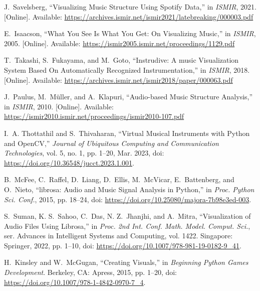 \documentclass{article}
\begin{document}
\newpage
\begin{thebibliography}{citations}


J.~Savelsberg, ``Visualizing Music Structure Using Spotify Data,''
in {\em ISMIR}, 2021. [Online]. Available: \url{https://archives.ismir.net/ismir2021/latebreaking/000003.pdf}

E.~Isaacson, ``What You See Is What You Get: On Visualizing Music,''
in {\em ISMIR}, 2005. [Online]. Available: \url{https://ismir2005.ismir.net/proceedings/1129.pdf}

T.~Takashi, S.~Fukayama, and M.~Goto, ``Instrudive: A music Visualization System Based On Automatically Recognized Instrumentation,''
in {\em ISMIR}, 2018. [Online]. Available: \url{https://archives.ismir.net/ismir2018/paper/000063.pdf}

J.~Paulus, M.~M\"uller, and A.~Klapuri, ``Audio-based Music Structure Analysis,''
in {\em ISMIR}, 2010. [Online]. Available: \url{https://ismir2010.ismir.net/proceedings/ismir2010-107.pdf}

I.~A. Thottathil and S.~Thivaharan, ``Virtual Musical Instruments with Python and OpenCV,'' \emph{Journal of Ubiquitous Computing and Communication Technologies}, vol. 5, no. 1, pp. 1–20, Mar. 2023, doi: \url{https://doi.org/10.36548/jucct.2023.1.001}.

B.~McFee, C.~Raffel, D.~Liang, D.~Ellis, M.~McVicar, E.~Battenberg, and O.~Nieto, ``librosa: Audio and Music Signal Analysis in Python,'' in \emph{Proc. Python Sci. Conf.}, 2015, pp. 18–24, doi: \url{https://doi.org/10.25080/majora-7b98e3ed-003}.

S.~Suman, K. S.~Sahoo, C.~Das, N. Z.~Jhanjhi, and A.~Mitra, ``Visualization of Audio Files Using Librosa,'' in \emph{Proc. 2nd Int. Conf. Math. Model. Comput. Sci.}, ser. Advances in Intelligent Systems and Computing, vol. 1422. Singapore: Springer, 2022, pp. 1–10, doi: \url{https://doi.org/10.1007/978-981-19-0182-9_41}.

H.~Kinsley and W.~McGugan, ``Creating Visuals,'' in \emph{Beginning Python Games Development}. Berkeley, CA: Apress, 2015, pp. 1–20, doi: \url{https://doi.org/10.1007/978-1-4842-0970-7_4}.


\end{thebibliography}
\end{document}
